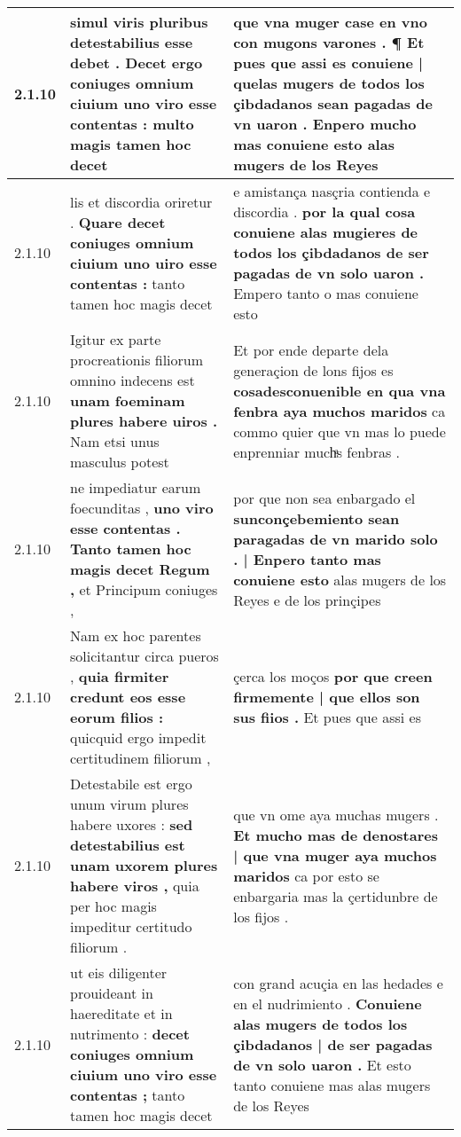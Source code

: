 \begin{tabular}{|p{1cm}|p{6.5cm}|p{6.5cm}|}
2.1.10 & simul viris pluribus detestabilius esse debet . \textbf{ Decet ergo coniuges omnium ciuium uno viro esse contentas : } multo magis tamen hoc decet & que vna muger case en vno con mugons varones . \textbf{ ¶ Et pues que assi es conuiene | quelas mugers de todos los çibdadanos sean pagadas de vn uaron . } Enpero mucho mas conuiene esto alas mugers de los Reyes \\\hline
2.1.10 & lis et discordia oriretur . \textbf{ Quare decet coniuges omnium ciuium uno uiro esse contentas : } tanto tamen hoc magis decet & e amistança nasçria contienda e discordia . \textbf{ por la qual cosa conuiene alas mugieres de todos los çibdadanos de ser pagadas de vn solo uaron . } Empero tanto o mas conuiene esto \\\hline
2.1.10 & Igitur ex parte procreationis filiorum omnino indecens est \textbf{ unam foeminam plures habere uiros . } Nam etsi unus masculus potest & Et por ende departe dela generaçion de lons fijos es \textbf{ cosadesconuenible en qua vna fenbra aya muchos maridos } ca commo quier que vn mas lo puede enprenniar muchͣs fenbras . \\\hline
2.1.10 & ne impediatur earum foecunditas , \textbf{ uno viro esse contentas . Tanto tamen hoc magis decet Regum , } et Principum coniuges , & por que non sea enbargado el \textbf{ sunconçebemiento sean paragadas de vn marido solo . | Enpero tanto mas conuiene esto } alas mugers de los Reyes e de los prinçipes \\\hline
2.1.10 & Nam ex hoc parentes solicitantur circa pueros , \textbf{ quia firmiter credunt eos esse eorum filios : } quicquid ergo impedit certitudinem filiorum , & çerca los moços \textbf{ por que creen firmemente | que ellos son sus fiios . } Et pues que assi es \\\hline
2.1.10 & Detestabile est ergo unum virum plures habere uxores : \textbf{ sed detestabilius est unam uxorem plures habere viros , } quia per hoc magis impeditur certitudo filiorum . & que vn ome aya muchas mugers . \textbf{ Et mucho mas de denostares | que vna muger aya muchos maridos } ca por esto se enbargaria mas la çertidunbre de los fijos . \\\hline
2.1.10 & ut eis diligenter prouideant in haereditate et in nutrimento : \textbf{ decet coniuges omnium ciuium uno viro esse contentas ; } tanto tamen hoc magis decet & con grand acuçia en las hedades e en el nudrimiento . \textbf{ Conuiene alas mugers de todos los çibdadanos | de ser pagadas de vn solo uaron . } Et esto tanto conuiene mas alas mugers de los Reyes \\\hline

\end{tabular}

